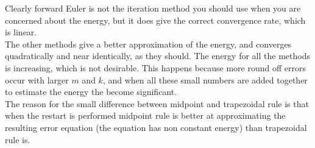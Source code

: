 Clearly forward Euler is not the iteration method you should use when you are concerned about the energy, but it does give the correct convergence rate, which is linear. \\

The other methods give a better approximation of the energy, and converges quadratically and near identically, as they should. The energy for all the methods is increasing, which is not desirable. This happens because more round off errors occur with larger $m$ and $k$, and when all these small numbers are added together to estimate the energy the become significant. \\

The reason for the small difference between midpoint and trapezoidal rule is that when the restart is performed midpoint rule is better at approximating the resulting error equation (the equation has non constant energy) than trapezoidal rule is. 

